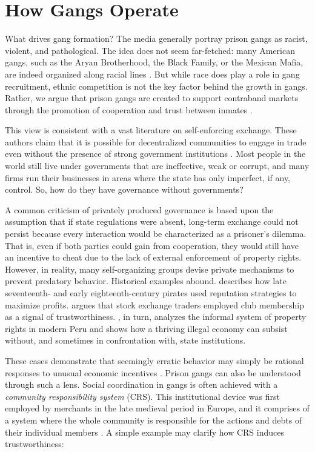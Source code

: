 \documentclass[a4paper, 12pt]{article}
\begin{document}
\section{How Gangs Operate}
\label{sec:gangsoperate}

\noindent
What drives gang formation? The media generally portray prison gangs as racist, violent, and pathological. The idea does not seem far-fetched: many American gangs, such as the Aryan Brotherhood, the Black Family, or the Mexican Mafia, are indeed organized along racial lines \citep{fong1990organizational,hunt1993change,pelz1991right}. But while race does play a role in gang recruitment, ethnic competition is not the key factor behind the growth in gangs. Rather, we argue that prison gangs are created to support contraband markets through the promotion of cooperation and trust between inmates \citep{fleisher2001overview,roth2014prison}. 

This view is consistent with a vast literature on self-enforcing exchange. These authors claim that it is possible for decentralized communities to engage in trade even without the presence of strong government institutions \citep[e.g.][]{ostrom1992covenants,powell2009public}. Most people in the world still live under governments that are ineffective, weak or corrupt, and many firms run their businesses in areas where the state has only imperfect, if any, control. So, how do they have governance without governments?

A common criticism of privately produced governance is based upon the assumption that if state regulations were absent, long-term exchange could not persist because every interaction would be characterized as a prisoner's dilemma. That is, even if both parties could gain from cooperation, they would still have an incentive to cheat due to the lack of external enforcement of property rights. However, in reality, many self-organizing groups devise private mechanisms to prevent predatory behavior. Historical examples abound. \citet{leeson2009invisible} describes how late seventeenth- and early eighteenth-century pirates used reputation strategies to maximize profits. \citet{stringham2015private} argues that stock exchange traders employed club membership as a signal of trustworthiness. \citet{de1990other}, in turn, analyzes the informal system of property rights in modern Peru and shows how a thriving illegal economy can subsist without, and sometimes in confrontation with, state institutions. 

These cases demonstrate that seemingly erratic behavior may simply be rational responses to unusual economic incentives \citep[p. 6]{leeson2009invisible}. Prison gangs can also be understood through such a lens. Social coordination in gangs is often achieved with a \textit{community responsibility system} (CRS). This institutional device was first employed by merchants in the late medieval period in Europe, and it comprises of a system where the whole community is responsible for the actions and debts of their individual members \citep{greif2006institutions}. A simple example may clarify how CRS induces trustworthiness: 
\end{document}
